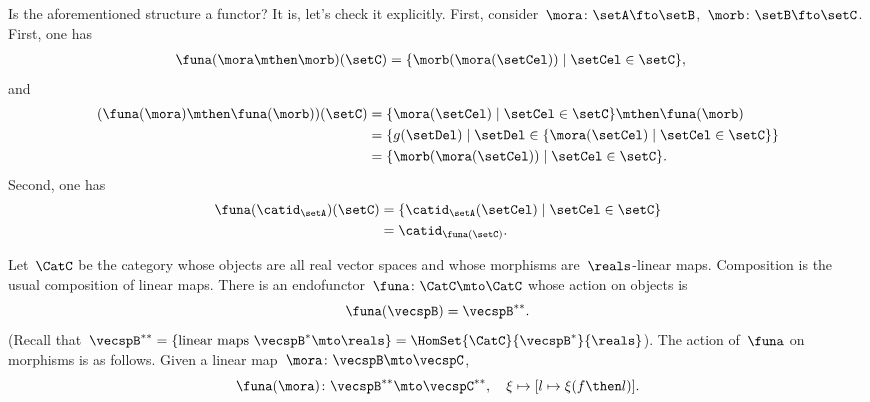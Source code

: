 \begin{example}
    Is the aforementioned structure a functor?
    It is, let's check it explicitly.
    First, consider~$\mora\colon \setA\fto \setB$,~$\morb\colon \setB \fto \setC$.
    First, one has
    \begin{equation*}
        \begin{aligned}
            \funa(\mora\mthen \morb)(\setC) & =\{ \morb(\mora(\setCel))\mid \setCel \in \setC\},
        \end{aligned}
    \end{equation*}
    and
    \begin{equation*}
        \begin{aligned}
            (\funa(\mora)\mthen \funa(\morb))(\setC)
             & =\{ \mora(\setCel) \mid \setCel \in \setC\}\mthen \funa(\morb)          \\
             & =\{g(\setDel)\mid \setDel \in \{\mora(\setCel)\mid \setCel\in \setC\}\} \\
             & =\{ \morb(\mora(\setCel))\mid \setCel \in \setC\}.
        \end{aligned}
    \end{equation*}
    Second, one has
    \begin{equation*}
        \begin{aligned}
            \funa(\catid_\setA)(\setC) & = \{\catid_\setA(\setCel)\mid \setCel \in \setC\} \\
                                       & =\catid_{\funa(\setC)}.
        \end{aligned}
    \end{equation*}
\end{example}

\begin{example}
    \label{exa:double-dual-functor}
    Let~$\CatC$ be the category whose objects are all real vector spaces and whose morphisms are~$\reals$-linear maps.
    Composition is the usual composition of linear maps.
    There is an endofunctor~$\funa \colon \CatC \mto \CatC$ whose action on objects is
    \begin{equation}
        \funa ( \vecspB ) = \vecspB^{**}.
    \end{equation}
    (Recall that~$\vecspB^{**} = \{ \text{linear maps } \vecspB^* \mto \reals \} =  \HomSet{\CatC}{\vecspB^*}{\reals}$).
    The action of~$\funa$ on morphisms is as follows.
    Given a linear map~$\mora \colon \vecspB \mto \vecspC$,
    \begin{equation}
        \funa ( \mora ) \colon \vecspB^{**} \mto \vecspC^{**}, \quad \xi \mapsto [ l \mapsto \xi (f \then l)].
    \end{equation}
\end{example}

